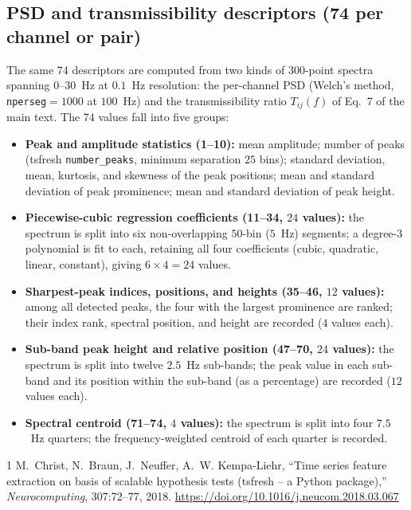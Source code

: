 \documentclass[11pt,a4paper]{article}
\begin{document}
\subsection{PSD and transmissibility descriptors (74 per channel or pair)}

The same $74$ descriptors are computed from two kinds of $300$-point spectra
spanning $0$--$30$~Hz at $0.1$~Hz resolution: the per-channel PSD (Welch's
method, \texttt{nperseg}$=1000$ at $100$~Hz) and the transmissibility ratio
$T_{ij}(f)$ of Eq.~7 of the main text. The $74$ values fall into five
groups:

\begin{itemize}
\item \textbf{Peak and amplitude statistics (1--10):} mean amplitude; number
of peaks (tsfresh \texttt{number\_peaks}, minimum separation $25$ bins);
standard deviation, mean, kurtosis, and skewness of the peak positions;
mean and standard deviation of peak prominence; mean and standard deviation
of peak height.
\item \textbf{Piecewise-cubic regression coefficients (11--34, $24$ values):}
the spectrum is split into six non-overlapping $50$-bin ($5$~Hz) segments;
a degree-$3$ polynomial is fit to each, retaining all four coefficients
(cubic, quadratic, linear, constant), giving $6\times4=24$ values.
\item \textbf{Sharpest-peak indices, positions, and heights (35--46, $12$
values):} among all detected peaks, the four with the largest prominence
are ranked; their index rank, spectral position, and height are recorded
($4$ values each).
\item \textbf{Sub-band peak height and relative position (47--70, $24$
values):} the spectrum is split into twelve $2.5$~Hz sub-bands; the peak
value in each sub-band and its position within the sub-band (as a
percentage) are recorded ($12$ values each).
\item \textbf{Spectral centroid (71--74, $4$ values):} the spectrum is split
into four $7.5$~Hz quarters; the frequency-weighted centroid of each
quarter is recorded.
\end{itemize}

\begin{thebibliography}{1}
M.~Christ, N.~Braun, J.~Neuffer, A.~W. Kempa-Liehr,
``Time series feature extraction on basis of scalable hypothesis tests
(tsfresh -- a Python package),''
\emph{Neurocomputing}, 307:72--77, 2018.
\url{https://doi.org/10.1016/j.neucom.2018.03.067}
\end{thebibliography}
\end{document}
